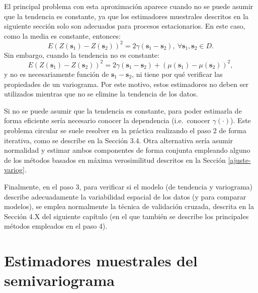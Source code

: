 \documentclass[
  spanish,
]{book}
\theoremstyle{break}
\begin{document}
El principal problema con esta aproximación aparece cuando no se puede asumir que la tendencia es constante, ya que los estimadores muestrales descritos en la siguiente sección solo son adecuados para procesos estacionarios.
En este caso, como la media es constante, entonces:
\begin{equation} 
  E(Z(\mathbf{s}_1) - Z(\mathbf{s}_{2}))^2 = 2\gamma(\mathbf{s}_1 -\mathbf{s}_{2}),
  \ \forall \mathbf{s}_1 ,\mathbf{s}_{2} \in D.
\label{eq:vario-est}
\end{equation}
Sin embargo, cuando la tendencia no es constante:
\begin{equation} 
  E(Z(\mathbf{s}_1) - Z(\mathbf{s}_{2}))^2 = 2\gamma(\mathbf{s}_1 - \mathbf{s}_{2}) 
  + \left( \mu(\mathbf{s}_1)-\mu(\mathbf{s}_{2})\right)^2,
\label{eq:vario-nest}
\end{equation}
y no es necesariamente función de \(\mathbf{s}_1 -\mathbf{s}_{2}\), ni tiene por qué verificar las propiedades de un variograma.
Por este motivo, estos estimadores no deben ser utilizados mientras que no se elimine la tendencia de los datos.

Si no se puede asumir que la tendencia es constante, para poder estimarla de forma eficiente sería necesario conocer la dependencia (i.e.~conocer \(\gamma(\cdot)\)).
Este problema circular se suele resolver en la práctica realizando el paso 2 de forma iterativa, como se describe en la Sección 3.4.
Otra alternativa sería asumir normalidad y estimar ambos componentes de forma conjunta empleando alguno de los métodos basados en máxima verosimilitud descritos en la Sección \ref{ajuste-variog}.

Finalmente, en el paso 3, para verificar si el modelo (de tendencia y variograma) describe adecuadamente la variabilidad espacial de los datos (y para comparar modelos), se emplea normalmente la técnica de validación cruzada, descrita en la Sección 4.X del siguiente capítulo (en el que también se describe los principales métodos empleados en el paso 4).

\hypertarget{vario-muestrales}{%
\section{Estimadores muestrales del semivariograma}\label{vario-muestrales}}
\end{document}
